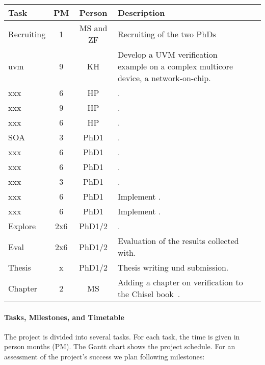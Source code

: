 \documentclass[fleqn,12pt]{article}
\begin{document}
\begin{table*}%
{\small
  \begin{center}
    \begin{tabular}{lccp{110mm}l}
      \toprule
      Task          & PM  & Person &  Description \\
      \midrule
      Recruiting  & 1 & MS and ZF & Recruiting of the two PhDs \\
      \midrule
      uvm     &  9      & KH     & Develop a UVM verification example on a complex multicore device, a network-on-chip.\\
      xxx     &  6      & HP     & .\\
      xxx    &  9      & HP     & .\\
      xxx     &  6      & HP     & .\\
      \midrule
      SOA  & 3      & PhD1     &  . \\
      xxx  & 6      & PhD1     &  . \\
      xxx  & 6      & PhD1     &  . \\
      xxx  & 3      & PhD1     &  . \\
      xxx  & 6      & PhD1     &  Implement . \\
      xxx  & 6      & PhD1     &  Implement . \\
      \midrule
      Explore   &    2x6 & PhD1/2    &  .\\
      Eval & 2x6 & PhD1/2 & Evaluation of the results collected with. \\
      Thesis & x & PhD1/2 & Thesis writing und submission.\\
      \midrule
      Chapter & 2 & MS & Adding a chapter on verification to the Chisel book~\cite{chisel:book}. \\
      \bottomrule
    \end{tabular}
  \end{center}
}
\end{table*}

\paragraph*{Tasks, Milestones, and Timetable}

The project is divided into several tasks.
For each task, the time is given in person months (PM). The Gantt chart shows
the project schedule.
For an assessment of the project's success we plan following milestones:
\end{document}
